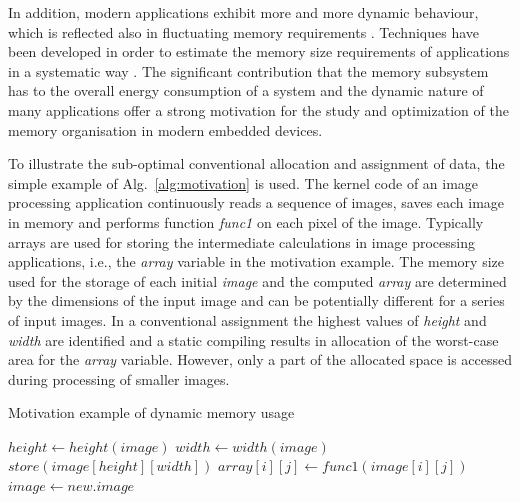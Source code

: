 \documentclass[smallcondensed]{svjour3}
\begin{document}
In addition, modern applications exhibit more and more dynamic behaviour, which is reflected also in fluctuating memory requirements \cite{tcm}. 
Techniques have been developed in order to estimate the memory size requirements of applications in a systematic way \cite{Ang13}. 
The significant contribution that the memory subsystem has to the overall energy consumption of a system and the dynamic nature of many applications offer a strong motivation for the study and optimization of the memory organisation in modern embedded devices.

To illustrate the sub-optimal conventional allocation and assignment of data, the simple example of Alg.~\ref{alg:motivation} is used. 
The kernel code of an image processing application continuously reads a sequence of images, saves each image in memory and performs function \textit{func1} on each pixel of the image. 
Typically arrays are used for storing the intermediate calculations in image processing applications, i.e., the \textit{array} variable in the motivation example. 
The memory size used for the storage of each initial \textit{image} and the computed \textit{array} are determined by the dimensions of the input image and can be potentially different for a series of input images. 
In a conventional assignment the highest values of \textit{height} and \textit{width} are identified and a static compiling results in allocation of the worst-case area for the \textit{array} variable. 
However, only a part of the allocated space is accessed during processing of smaller images. 

\begin{algorithm}
\caption{Motivation example of dynamic memory usage}
 \label{alg:motivation}
 \begin{algorithmic}[1]
		\STATE $height \gets height(image)$
		\STATE $width \gets width(image)$
		\STATE $store(image[height][width])$
					\STATE $array[i][j] \gets func1(image[i][j])$
				\ENDFOR
			\ENDFOR
		\STATE $image \gets new.image$	
	\ENDWHILE
 \end{algorithmic}
\end{algorithm}
\end{document}
